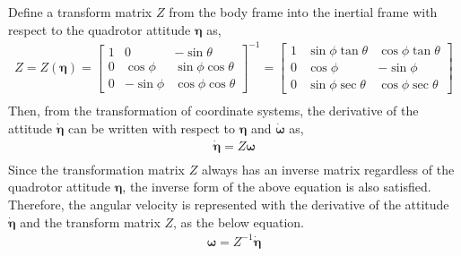 Define a transform matrix \(Z\) from the body frame into the inertial frame with respect to the quadrotor attitude \({\boldsymbol \eta}\) as,\\
\begin{equation}
\begin{aligned}
Z = Z({\boldsymbol \eta}) = 
\begin{bmatrix}
1 	& 0    		& - \sin{\theta}\\
0 	& \cos{\phi}	& \sin{\phi} \cos{\theta} \\
0	& - \sin{\phi}	& \cos{\phi} \cos{\theta}
\end{bmatrix} ^{-1}
=
\begin{bmatrix}
1 & \sin{\phi} \tan{\theta}    & \cos{\phi} \tan{\theta}\\
0 & \cos{\phi}                     & - \sin{\phi} \\
0 & \sin{\phi} \sec{\theta} & \cos{\phi} \sec{\theta}
\end{bmatrix}\\
\end{aligned}
\end{equation}
Then, from the transformation of coordinate systems, the derivative of the attitude \(\dot{\boldsymbol \eta}\) can be written with respect to \({\boldsymbol \eta}\) and \(\dot{\boldsymbol \omega}\) as, \\
\begin{equation}
\label{eq:z_omega}
\begin{aligned}
{\dot {\boldsymbol \eta}} = Z {\boldsymbol \omega}\\
\end{aligned}
\end{equation}
Since the transformation matrix \(Z\) always has an inverse matrix regardless of the quadrotor attitude \({\boldsymbol \eta}\), the inverse form of the above equation is also satisfied. Therefore, the angular velocity is represented with the derivative of the attitude \(\dot{\boldsymbol \eta}\) and the transform matrix \(Z\), as the below equation.\\
\begin{equation}
\begin{aligned}
\label{eq:z_inv_eta}
{\boldsymbol \omega} = Z^{-1}{\dot {\boldsymbol \eta}} \\
\end{aligned}
\end{equation}


